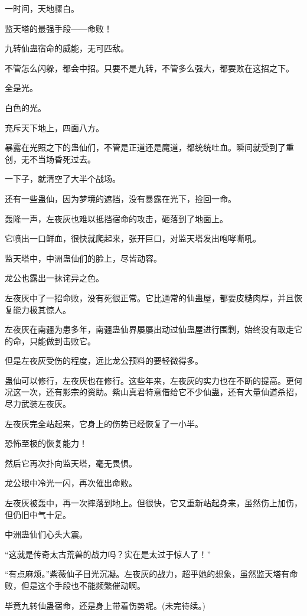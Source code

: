 \begin{this_body}
一时间，天地骤白。

监天塔的最强手段――命败！

九转仙蛊宿命的威能，无可匹敌。

不管怎么闪躲，都会中招。只要不是九转，不管多么强大，都要败在这招之下。

全是光。

白色的光。

充斥天下地上，四面八方。

暴露在光照之下的蛊仙们，不管是正道还是魔道，都统统吐血。瞬间就受到了重创，无不当场昏死过去。

一下子，就清空了大半个战场。

还有一些蛊仙，因为梦境的遮挡，没有暴露在光下，捡回一命。

轰隆一声，左夜灰也难以抵挡宿命的攻击，砸落到了地面上。

它喷出一口鲜血，很快就爬起来，张开巨口，对监天塔发出咆哮嘶吼。

监天塔中，中洲蛊仙们的脸上，尽皆动容。

龙公也露出一抹诧异之色。

左夜灰中了一招命败，没有死很正常。它比通常的仙蛊屋，都要皮糙肉厚，并且恢复能力极其惊人。

左夜灰在南疆为患多年，南疆蛊仙界屡屡出动过仙蛊屋进行围剿，始终没有取走它的命，只能做到击败它。

但是左夜灰受伤的程度，远比龙公预料的要轻微得多。

蛊仙可以修行，左夜灰也在修行。这些年来，左夜灰的实力也在不断的提高。更何况这一次，还有影宗的资助。紫山真君特意借给它不少仙蛊，还有大量仙道杀招，尽力武装左夜灰。

左夜灰完全站起来，它身上的伤势已经恢复了一小半。

恐怖至极的恢复能力！

然后它再次扑向监天塔，毫无畏惧。

龙公眼中冷光一闪，再次催出命败。

左夜灰被轰中，再一次摔落到地上。但很快，它又重新站起身来，虽然伤上加伤，但仍旧中气十足。

中洲蛊仙们心头大震。

“这就是传奇太古荒兽的战力吗？实在是太过于惊人了！”

“有点麻烦。”紫薇仙子目光沉凝。左夜灰的战力，超乎她的想象，虽然监天塔有命败，但是这个手段也不能频繁催动啊。

毕竟九转仙蛊宿命，还是身上带着伤势呢。(未完待续。)

\end{this_body}

